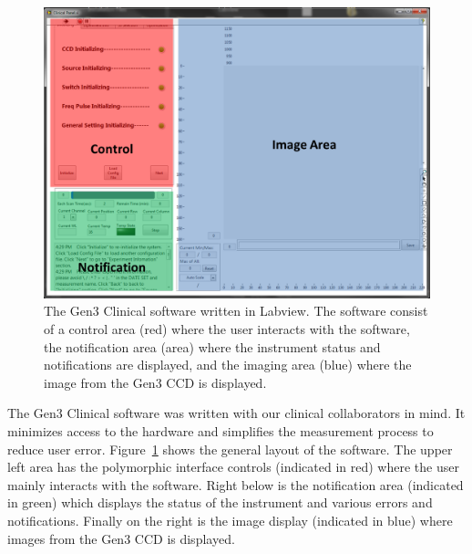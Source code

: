 \begin{figure}[h]
\centering
\includegraphics[width=13.5cm]{./figures/A_Gen3Software/Clinical1.png}
\caption[The Gen3 Clinical software written in Labview]{The Gen3 Clinical software written in Labview. The software consist of a control area (red) where the user interacts with the software, the notification area (area) where the instrument status and notifications are displayed, and the imaging area (blue) where the image from the Gen3 CCD is displayed.}
\label{fig:Clinical1}
\end{figure}
The Gen3 Clinical software was written with our clinical collaborators in mind. It minimizes access to the hardware and simplifies the measurement process to reduce user error. Figure~\ref{fig:Clinical1} shows the general layout of the software. The upper left area has the polymorphic interface controls (indicated in red) where the user mainly interacts with the software. Right below is the notification area (indicated in green) which displays the status of the instrument and various errors and notifications. Finally on the right is the image display (indicated in blue) where images from the Gen3 CCD is displayed.

